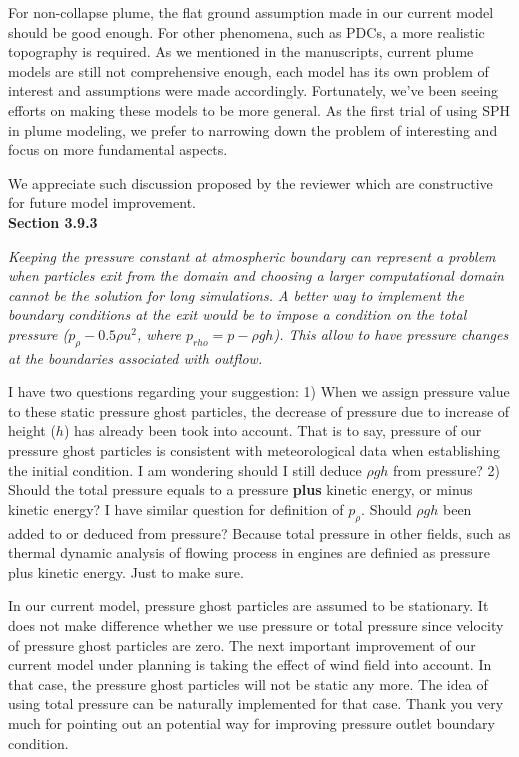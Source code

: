 \documentclass[10pt,a4paper]{article}
\begin{document}
For non-collapse plume, the flat ground assumption made in our current model should be good enough. For other phenomena, such as PDCs, a more realistic topography is required. As we mentioned in the manuscripts, current plume models are still not comprehensive enough, each model has its own problem of interest and assumptions were made accordingly. Fortunately, we’ve been seeing efforts on making these models to be more general. As the first trial of using SPH in plume modeling, we prefer to narrowing down the problem of interesting and focus on more fundamental aspects.
 
We appreciate such discussion proposed by the reviewer which are constructive for future model improvement. \\[6pt]

\textbf{Section 3.9.3}

\textit{Keeping the pressure constant at atmospheric boundary can represent a problem when particles exit from the domain and choosing a larger computational domain cannot be the solution for long simulations. A better way to implement the boundary conditions at the exit would be to impose a condition on the total pressure ($p_{\rho}-0.5 \rho u^2$, where $p_{rho}=p-\rho g h$). This allow to have pressure changes at the boundaries associated with outflow.}

I have two questions regarding your suggestion: 
1) When we assign pressure value to these static pressure ghost particles, the decrease of pressure due to increase of height ($h$) has already been took into account. That is to say, pressure of our pressure ghost particles is consistent with meteorological data when establishing the initial condition. I am wondering should I still deduce $\rho g h$ from pressure?  
2) Should the total pressure equals to a pressure \textbf{plus} kinetic energy, or minus kinetic energy? I have similar question for definition of $p_{\rho}$. Should $\rho g h$ been added to or deduced from pressure? Because total pressure in other fields, such as thermal dynamic analysis of flowing process in engines are definied as pressure plus kinetic energy. Just to make sure.

In our current model, pressure ghost particles are assumed to be stationary. It does not make difference whether we use pressure or total pressure since velocity of pressure ghost particles are zero. The next important improvement of our current model under planning is taking the effect of wind field into account. In that case, the pressure ghost particles will not be static any more. The idea of using total pressure can be naturally implemented for that case. Thank you very much for pointing out an potential way for improving pressure outlet boundary condition. \\[6pt]
\end{document}
